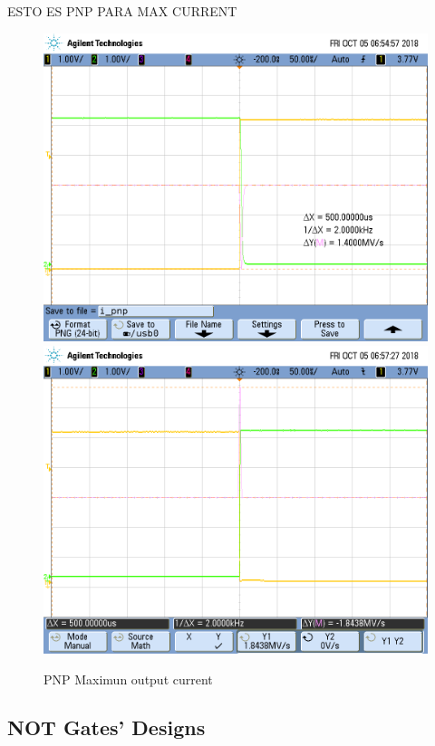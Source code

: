 ESTO ES PNP PARA MAX CURRENT
\begin{figure}[h!]
\centering
\includegraphics[scale=0.3]{../Exercise1/i_pnp.png}\hspace{1cm}
\includegraphics[scale=0.3]{../Exercise1/i_pnp1.png}
\caption{PNP Maximun output current}
\label{circpnpmaxout}
\end{figure}


\subsection{\color{purple}NOT Gates' Designs}

